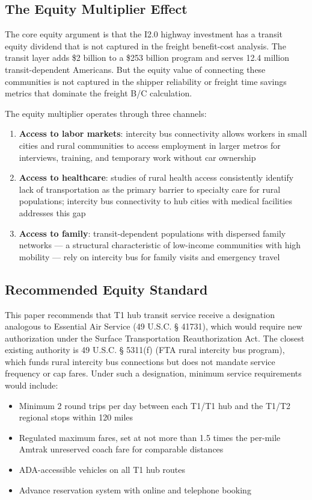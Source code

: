 \subsection{The Equity Multiplier Effect}

The core equity argument is that the I2.0 highway investment has a transit equity dividend that is not captured in the freight benefit-cost analysis. The transit layer adds \$2 billion to a \$253 billion program and serves 12.4 million transit-dependent Americans. But the equity value of connecting these communities is not captured in the shipper reliability or freight time savings metrics that dominate the freight B/C calculation.

The equity multiplier operates through three channels:
\begin{enumerate}
  \item \textbf{Access to labor markets}: intercity bus connectivity allows workers in small cities and rural communities to access employment in larger metros for interviews, training, and temporary work without car ownership
  \item \textbf{Access to healthcare}: studies of rural health access consistently identify lack of transportation as the primary barrier to specialty care for rural populations; intercity bus connectivity to hub cities with medical facilities addresses this gap \citep{Pisarski2006}
  \item \textbf{Access to family}: transit-dependent populations with dispersed family networks --- a structural characteristic of low-income communities with high mobility --- rely on intercity bus for family visits and emergency travel
\end{enumerate}

\subsection{Recommended Equity Standard}

This paper recommends that T1 hub transit service receive a designation analogous to Essential Air Service (49 U.S.C. § 41731), which would require new authorization under the Surface Transportation Reauthorization Act. The closest existing authority is 49 U.S.C. § 5311(f) (FTA rural intercity bus program), which funds rural intercity bus connections but does not mandate service frequency or cap fares. Under such a designation, minimum service requirements would include:
\begin{itemize}
  \item Minimum 2 round trips per day between each T1/T1 hub and the T1/T2 regional stops within 120 miles
  \item Regulated maximum fares, set at not more than 1.5 times the per-mile Amtrak unreserved coach fare for comparable distances
  \item ADA-accessible vehicles on all T1 hub routes
  \item Advance reservation system with online and telephone booking
\end{itemize}

